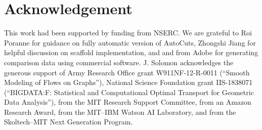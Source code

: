 
\section*{Acknowledgement}

This work had been supported by funding from NSERC.  We are grateful to Roi Poranne for guidance on fully automatic version of AutoCuts, Zhongshi Jiang for helpful discussion on scaffold implementation, and  and  from Adobe for generating comparison data using commercial software. J. Solomon acknowledges the generous support of Army Research Office grant W911NF-12-R-0011 (``Smooth Modeling of Flows on Graphs''), National Science Foundation grant IIS-1838071 (``BIGDATA:F: Statistical and Computational Optimal Transport for Geometric Data Analysis''), from the MIT Research Support Committee, from an Amazon Research Award, from the MIT--IBM Watson AI Laboratory, and from the Skoltech--MIT Next Generation Program.